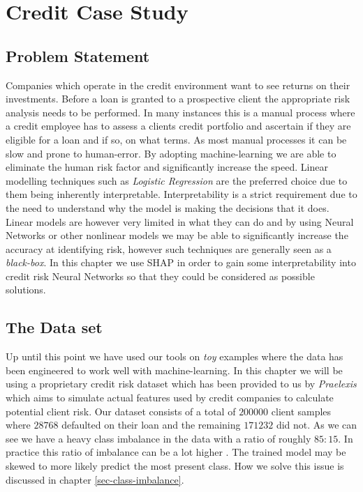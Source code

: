 
\chapter{Credit Case Study}

\section{Problem Statement}
Companies which operate in the credit environment want to see returns on their investments. Before a loan is granted to a prospective client the appropriate risk analysis needs to be performed. In many instances this is a manual process where a credit employee has to assess a clients credit portfolio and ascertain if they are eligible for a loan and if so, on what terms. As most manual processes it can be slow and prone to human-error. By adopting machine-learning we are able to eliminate the human risk factor and significantly increase the speed. Linear modelling techniques such as \emph{Logistic Regression} are the preferred choice due to them being inherently interpretable. Interpretability is a strict requirement due to the need to understand why the model is making the decisions that it does. Linear models are however very limited in what they can do and by using Neural Networks or other nonlinear models we may be able to significantly increase the accuracy at identifying risk, however such techniques are generally seen as a \emph{black-box}. In this chapter we use SHAP in order to gain some interpretability into credit risk Neural Networks so that they could be considered as possible solutions.

\section{The Data set} Up until this point we have used our tools on \emph{toy} examples where the data has been engineered to work well with machine-learning. In this chapter we will be using a proprietary credit risk dataset which has been provided to us by \emph{Praelexis} which aims to simulate actual features used by credit companies to calculate potential client risk. Our dataset consists of a total of $200000$ client samples where $28768$ defaulted on their loan and the remaining $171232$ did not. As we can see we have a heavy class imbalance in the data with a ratio of roughly $85:15$. In practice this ratio of imbalance can be a lot higher \cite{doi:10.1142/9789812813312_0009}. The trained model may be skewed to more likely predict the most present class. How we solve this issue is discussed in chapter \ref{sec-class-imbalance}.

